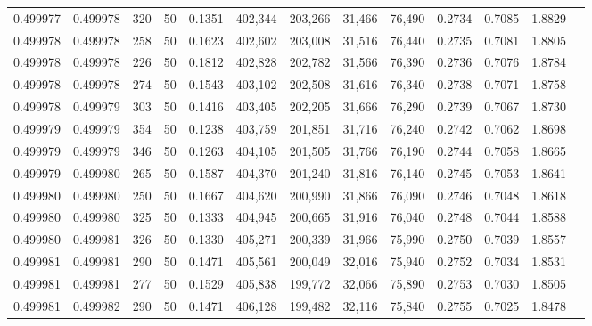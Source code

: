 \begin{tabular}{rrrrrrrrrrrrr}
0.499977 & 0.499978 &   320 &  50 &                                     0.1351 & 402,344 & 203,266 &  31,466 &  76,490 & 0.2734 & 0.7085 & 1.8829 \\
0.499978 & 0.499978 &   258 &  50 &                                     0.1623 & 402,602 & 203,008 &  31,516 &  76,440 & 0.2735 & 0.7081 & 1.8805 \\
0.499978 & 0.499978 &   226 &  50 &                                     0.1812 & 402,828 & 202,782 &  31,566 &  76,390 & 0.2736 & 0.7076 & 1.8784 \\
0.499978 & 0.499978 &   274 &  50 &                                     0.1543 & 403,102 & 202,508 &  31,616 &  76,340 & 0.2738 & 0.7071 & 1.8758 \\
0.499978 & 0.499979 &   303 &  50 &                                     0.1416 & 403,405 & 202,205 &  31,666 &  76,290 & 0.2739 & 0.7067 & 1.8730 \\
0.499979 & 0.499979 &   354 &  50 &                                     0.1238 & 403,759 & 201,851 &  31,716 &  76,240 & 0.2742 & 0.7062 & 1.8698 \\
0.499979 & 0.499979 &   346 &  50 &                                     0.1263 & 404,105 & 201,505 &  31,766 &  76,190 & 0.2744 & 0.7058 & 1.8665 \\
0.499979 & 0.499980 &   265 &  50 &                                     0.1587 & 404,370 & 201,240 &  31,816 &  76,140 & 0.2745 & 0.7053 & 1.8641 \\
0.499980 & 0.499980 &   250 &  50 &                                     0.1667 & 404,620 & 200,990 &  31,866 &  76,090 & 0.2746 & 0.7048 & 1.8618 \\
0.499980 & 0.499980 &   325 &  50 &                                     0.1333 & 404,945 & 200,665 &  31,916 &  76,040 & 0.2748 & 0.7044 & 1.8588 \\
0.499980 & 0.499981 &   326 &  50 &                                     0.1330 & 405,271 & 200,339 &  31,966 &  75,990 & 0.2750 & 0.7039 & 1.8557 \\
0.499981 & 0.499981 &   290 &  50 &                                     0.1471 & 405,561 & 200,049 &  32,016 &  75,940 & 0.2752 & 0.7034 & 1.8531 \\
0.499981 & 0.499981 &   277 &  50 &                                     0.1529 & 405,838 & 199,772 &  32,066 &  75,890 & 0.2753 & 0.7030 & 1.8505 \\
0.499981 & 0.499982 &   290 &  50 &                                     0.1471 & 406,128 & 199,482 &  32,116 &  75,840 & 0.2755 & 0.7025 & 1.8478 \\

\end{tabular}
